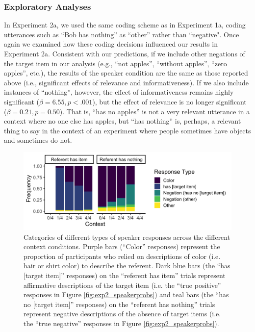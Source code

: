 \documentclass[man, floatsintext, noapacite]{apa6}
\begin{document}
\subsubsection{Exploratory Analyses}

In Experiment 2a, we used the same coding scheme as in Experiment 1a, coding utterances such as “Bob has nothing” as “other” rather than “negative". Once again we examined how these coding decisions influenced our results in Experiment 2a. Consistent with our predictions, if we include other negations of the target item in our analysis (e.g., “not apples”, “without apples”, “zero apples”, etc.), the results of the speaker condition are the same as those reported above (i.e., significant effects of relevance and informativeness). If we also include instances of “nothing”, however, the effect of informativeness remains highly significant ($\beta = 6.55, p < .001$), but the effect of relevance is no longer significant ($\beta = 0.21, p = 0.50$). That is, “has no apples” is not a very relevant utterance in a context where no one else has apples, but “has nothing” is, perhaps, a relevant thing to say in the context of an experiment where people sometimes have objects and sometimes do not.

\begin{figure}[t]
\begin{center} 
\includegraphics[width=7in]{figures/experiment2/speaker_responses_v1.png}
\caption{\label{fig:exp2_props} Categories of different types of speaker responses across the different context conditions. Purple bars (``Color'' responses) represent the proportion of participants who relied on descriptions of color (i.e. hair or shirt color) to describe the referent. Dark blue bars (the ``has [target item]'' responses) on the ``referent has item'' trials represent affirmative descriptions of the target item (i.e. the ``true positive'' responses in Figure \ref{fig:exp2_speakerprobs}) and teal bars (the ``has no [target item]'' responses) on the ``referent has nothing'' trials represent negative descriptions of the absence of target items (i.e. the ``true negative'' responses in Figure \ref{fig:exp2_speakerprobs}). }
\end{center} 
\end{figure}
\end{document}
